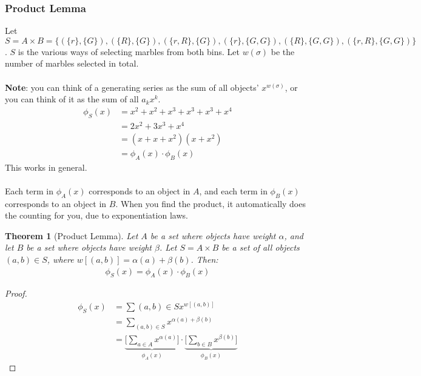 \documentclass[]{article}
\newtheorem*{theorem}{Theorem}
\theoremstyle{definition}
\newcommand{\lecture}[1]{\marginpar{{\footnotesize $\leftarrow$ \underline{#1}}}}
\begin{document}
			\subsubsection{Product Lemma} \lecture{January 18, 2013}
				Let $S = A \times B = \{ (\{r\}, \{G\}), (\{R\}, \{G\}), (\{r, R\}, \{G\}), (\{r\}, \{G, G\}), (\{R\}, \{G, G\}), (\{r, R\}, \{G, G\}) \}$. $S$ is the various ways of selecting marbles from both bins. Let $w(\sigma)$ be the number of marbles selected in total.
				\\ \\
				\textbf{Note}: you can think of a generating series as the sum of all objects' $x^{w(\sigma)}$, or you can think of it as the sum of all $a_k x^k$.
				\begin{align*}
					\phi_S(x) &= x^2 + x^2 + x^3 + x^3 + x^3 + x^4 \\
					&= 2x^2 + 3x^3 + x^4 \\
					&= (x + x + x^2)(x + x^2) \\
					&= \phi_A(x) \cdot \phi_B(x)
				\end{align*}
				This works in general.
				\\ \\
				Each term in $\phi_A(x)$ corresponds to an object in $A$, and each term in $\phi_B(x)$ corresponds to an object in $B$. When you find the product, it automatically does the counting for you, due to exponentiation laws.
				\begin{theorem}[Product Lemma]
					Let $A$ be a set where objects have weight $\alpha$, and let $B$ be a set where objects have weight $\beta$. Let $S = A \times B$ be a set of all objects $(a, b) \in S$, where $w[(a, b)] = \alpha(a) + \beta(b)$. Then:
					\begin{align*}
						\phi_S(x) = \phi_A(x) \cdot \phi_B(x)
					\end{align*}
				\end{theorem}

				\begin{proof}
					\begin{align*}
						\phi_S(x) &= \sum{(a, b) \in S} x^{w[(a, b)]} \\
						&= \sum_{(a, b) \in S} x^{\alpha(a) + \beta(b)} \\
						&= \underbrace{\bigg[ \sum_{a \in A} x^{\alpha(a)} \bigg]}_{\phi_A(x)} \cdot \underbrace{\bigg[ \sum_{b \in B} x^{\beta(b)} \bigg]}_{\phi_B(x)}
					\end{align*}
				\end{proof}
			
\end{document}

